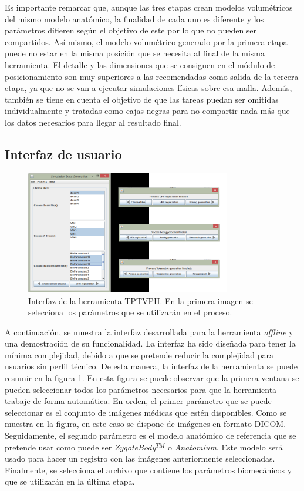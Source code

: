 Es importante remarcar que, aunque las tres etapas crean modelos volumétricos del mismo modelo anatómico, la finalidad de cada uno es diferente y los parámetros difieren según el objetivo de este por lo que no pueden ser compartidos. Así mismo, el modelo volumétrico generado por la primera etapa puede no estar en la misma posición que se necesita al final de la misma herramienta. El detalle y las dimensiones que se consiguen en el módulo de posicionamiento son muy superiores a las recomendadas como salida de la tercera etapa, ya que no se van a ejecutar simulaciones físicas sobre esa malla. Además, también se tiene en cuenta el objetivo de que las tareas puedan ser omitidas individualmente y tratadas como cajas negras para no compartir nada más que los datos necesarios para llegar al resultado final.


\subsection{Interfaz de usuario}
\label{rasim:herramientaui}

\begin{figure}[h]
    \centering
    \includegraphics[width=0.8\textwidth]{IMG/toolkitui.png}
    \caption{Interfaz de la herramienta \ac{TPTVPH}. En la primera imagen se selecciona los parámetros que se utilizarán en el proceso. }
    \label{fig:toolui}
\end{figure}
A continuación, se muestra la interfaz desarrollada para la herramienta \emph{offline} y una demostración de su funcionalidad. 
La interfaz ha sido diseñada para tener la mínima complejidad, debido a que se pretende reducir la complejidad para usuarios sin perfil técnico. De esta manera, la interfaz de la herramienta se puede resumir en la figura \ref{fig:toolui}. En esta figura se puede observar que la primera ventana se pueden seleccionar todos los parámetros necesarios para que la herramienta trabaje de forma automática.
En orden, el primer parámetro que se puede seleccionar es el conjunto de imágenes médicas que estén disponibles. Como se muestra en la figura, en este caso se dispone de imágenes en formato \ac{DICOM}.
Seguidamente, el segundo parámetro es el modelo anatómico de referencia que se pretende usar como puede ser \emph{ZygoteBody}$^{TM}$ o \emph{Anatomium}. Este modelo será usado para hacer un registro con las imágenes anteriormente seleccionadas. 
Finalmente, se selecciona el archivo que contiene los parámetros biomecánicos y que se utilizarán en la última etapa.



